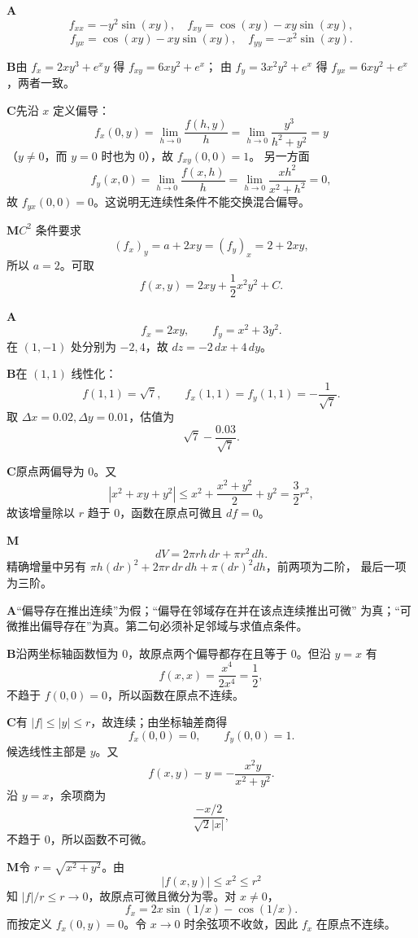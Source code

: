 \begin{solutionBox}
\textbf{A}\quad
\[
f_{xx}=-y^2\sin(xy),\quad
f_{xy}=\cos(xy)-xy\sin(xy),
\]
\[
f_{yx}=\cos(xy)-xy\sin(xy),\quad
f_{yy}=-x^2\sin(xy).
\]

\textbf{B}\quad 由
\(f_x=2xy^3+e^xy\) 得 \(f_{xy}=6xy^2+e^x\)；
由 \(f_y=3x^2y^2+e^x\) 得 \(f_{yx}=6xy^2+e^x\)，两者一致。

\textbf{C}\quad 先沿 \(x\) 定义偏导：
\[
f_x(0,y)=\lim_{h\to0}\frac{f(h,y)}h
=\lim_{h\to0}\frac{y^3}{h^2+y^2}=y
\]
（\(y\ne0\)，而 \(y=0\) 时也为 \(0\)），故 \(f_{xy}(0,0)=1\)。
另一方面
\[
f_y(x,0)=\lim_{h\to0}\frac{f(x,h)}h
=\lim_{h\to0}\frac{xh^2}{x^2+h^2}=0,
\]
故 \(f_{yx}(0,0)=0\)。这说明无连续性条件不能交换混合偏导。

\textbf{M}\quad \(C^2\) 条件要求
\[
(f_x)_y=a+2xy=(f_y)_x=2+2xy,
\]
所以 \(a=2\)。可取
\[
f(x,y)=2xy+\frac12x^2y^2+C.
\]
\end{solutionBox}

\begin{solutionBox}
\textbf{A}\quad
\[
f_x=2xy,\qquad f_y=x^2+3y^2.
\]
在 \((1,-1)\) 处分别为 \(-2,4\)，故 \(dz=-2\,dx+4\,dy\)。

\textbf{B}\quad 在 \((1,1)\) 线性化：
\[
f(1,1)=\sqrt7,\qquad f_x(1,1)=f_y(1,1)=-\frac1{\sqrt7}.
\]
取 \(\Delta x=0.02,\Delta y=0.01\)，估值为
\[
\sqrt7-\frac{0.03}{\sqrt7}.
\]

\textbf{C}\quad 原点两偏导为 \(0\)。又
\[
|x^2+xy+y^2|
\le x^2+\frac{x^2+y^2}{2}+y^2
=\frac32r^2,
\]
故该增量除以 \(r\) 趋于 \(0\)，函数在原点可微且 \(df=0\)。

\textbf{M}\quad
\[
dV=2\pi rh\,dr+\pi r^2\,dh.
\]
精确增量中另有
\(\pi h(dr)^2+2\pi r\,dr\,dh+\pi(dr)^2dh\)，前两项为二阶，
最后一项为三阶。
\end{solutionBox}

\begin{solutionBox}
\textbf{A}\quad “偏导存在推出连续”为假；“偏导在邻域存在并在该点连续推出可微”
为真；“可微推出偏导存在”为真。第二句必须补足邻域与求值点条件。

\textbf{B}\quad 沿两坐标轴函数恒为 \(0\)，故原点两个偏导都存在且等于
\(0\)。但沿 \(y=x\) 有
\[
f(x,x)=\frac{x^4}{2x^4}=\frac12,
\]
不趋于 \(f(0,0)=0\)，所以函数在原点不连续。

\textbf{C}\quad 有 \(|f|\le|y|\le r\)，故连续；由坐标轴差商得
\[
f_x(0,0)=0,\qquad f_y(0,0)=1.
\]
候选线性主部是 \(y\)。又
\[
f(x,y)-y=-\frac{x^2y}{x^2+y^2}.
\]
沿 \(y=x\)，余项商为
\[
\frac{-x/2}{\sqrt2|x|},
\]
不趋于 \(0\)，所以函数不可微。

\textbf{M}\quad 令 \(r=\sqrt{x^2+y^2}\)。由
\[
|f(x,y)|\le x^2\le r^2
\]
知 \(|f|/r\le r\to0\)，故原点可微且微分为零。对 \(x\ne0\)，
\[
f_x=2x\sin(1/x)-\cos(1/x).
\]
而按定义 \(f_x(0,y)=0\)。令 \(x\to0\) 时余弦项不收敛，因此
\(f_x\) 在原点不连续。
\end{solutionBox}

